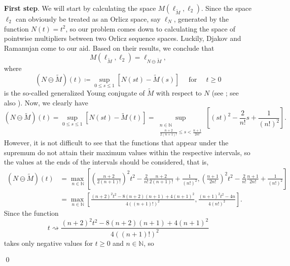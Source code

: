 \documentclass[11pt]{amsart}
\theoremstyle{definition}
\theoremstyle{definition}
\theoremstyle{definition}
\theoremstyle{definition}
\theoremstyle{definition}
\theoremstyle{definition}
\theoremstyle{definition}
\theoremstyle{definition}
\numberwithin{equation}{section}
\numberwithin{equation}{section}
\numberwithin{equation}{section}
\theoremstyle{definition}
\theoremstyle{definition}
\theoremstyle{definition}
\theoremstyle{definition}
\theoremstyle{definition}
\theoremstyle{definition}
\renewenvironment{proof}{\noindent {\bf Proof.}}{\qed}
\begin{document}
\begin{proof}
	{\bf First step}. We will start by calculating the space $M(\ell_{\widetilde{M}}, \ell_2)$. Since the space $\ell_2$ can obviously be treated
	as an Orlicz space, say $\ell_N$, generated by the function $N(t) = t^2$, so our problem comes down to calculating the space of pointwise
	multipliers between two Orlicz sequence spaces. Luckily, Djakov and Ramanujan \cite{DR00} come to our aid. Based on their results,
	we conclude that
	\begin{equation*}
		M(\ell_{\widetilde{M}}, \ell_2) = \ell_{N \ominus \widetilde{M}},
	\end{equation*}
	where
	\begin{equation*}
		( N \ominus \widetilde{M} )(t) \coloneqq \sup_{0 \leqslant s \leqslant 1}\left[ N(st) - \widetilde{M}(s) \right]
			\quad \text{ for } \quad t \geqslant 0
	\end{equation*}
	is the so-called generalized Young conjugate of $\widetilde{M}$ with respect to $N$ (see \cite[Theorem~3]{DR00}; see also \cite{LT21}).
	Now, we clearly have
	\begin{equation*}
		( N \ominus \widetilde{M} )(t) = \sup\limits_{0 \leqslant s \leqslant 1}\left[ N(st) - \widetilde{M}(t) \right]
			= \sup\limits_{\substack{n \in \mathbb{N}\\ \frac{n+2}{2(n+1)!} \leqslant s < \frac{n+1}{2n!}}} \left[ (st)^2 - \frac{2}{n!}s + \frac{1}{(n!)^2} \right].
	\end{equation*}
	However, it is not difficult to see that the functions that appear under the supremum do not attain their maximum values within the respective intervals,
	so the values at the ends of the intervals should be considered, that is,
	\begin{align*}
		( N \ominus \widetilde{M} )(t)
			& = \max\limits_{\ n \in \mathbb{N}}\left[ \left( \frac{n+2}{2(n+1)!} \right)^{2} t^2 - \frac{2}{n!}\frac{n+2}{2(n+1)!}
				+ \frac{1}{(n!)^{2}}, \left( \frac{n+1}{2n!} \right)^{2} t^2 - \frac{2}{n!}\frac{n+1}{2n!} + \frac{1}{(n!)^{2}}\right]\\
			& = \max\limits_{\ n\in \mathbb{N}}\left[ \frac{(n+2)^{2}t^{2} - 8(n+2)(n+1) + 4(n+1)^{2}}{4\left( (n+1)! \right)^{2}},\frac{(n+1)^{2}t^{2}-4n}{4(n!)^{2}} \right].
	\end{align*}
	Since the function
	\begin{equation*}
		t \rightsquigarrow \frac{(n+2)^2 t^2 - 8(n+2)(n+1) + 4(n+1)^2}{4\left( (n+1)! \right)^2}
	\end{equation*}
	takes only negative values for $t \geqslant 0$ and $n \in \mathbb{N}$, so

\end{proof}
\end{document}
